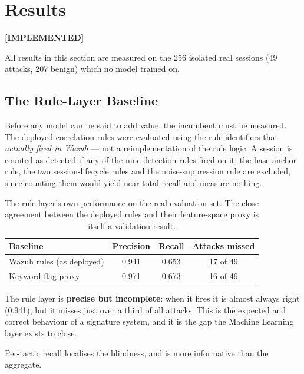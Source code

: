 \documentclass{classeENS}
\providecommand{\statusdone}{\textbf{[IMPLEMENTED]}}
\begin{document}
\section{Results}
\label{sec:results}
\statusdone

All results in this section are measured on the 256 isolated real sessions (49 attacks, 207 benign) which no model trained on.

\subsection{The Rule-Layer Baseline}
Before any model can be said to add value, the incumbent must be measured. The deployed correlation rules were evaluated using the rule identifiers that \emph{actually fired in Wazuh} --- not a reimplementation of the rule logic. A session is counted as detected if any of the nine detection rules fired on it; the base anchor rule, the two session-lifecycle rules and the noise-suppression rule are excluded, since counting them would yield near-total recall and measure nothing.

\begin{table}[H]
\centering
\begin{tabular}{|l|c|c|c|}
\hline
\textbf{Baseline} & \textbf{Precision} & \textbf{Recall} & \textbf{Attacks missed} \\
\hline
Wazuh rules (as deployed) & 0.941 & 0.653 & 17 of 49 \\
Keyword-flag proxy & 0.971 & 0.673 & 16 of 49 \\
\hline
\end{tabular}
\caption{The rule layer's own performance on the real evaluation set. The close agreement between the deployed rules and their feature-space proxy is itself a validation result.}
\label{tab:baseline}
\end{table}

The rule layer is \textbf{precise but incomplete}: when it fires it is almost always right (0.941), but it misses just over a third of all attacks. This is the expected and correct behaviour of a signature system, and it is the gap the Machine Learning layer exists to close.

Per-tactic recall localises the blindness, and is more informative than the aggregate.
\end{document}
